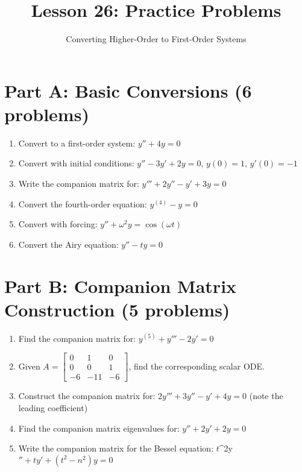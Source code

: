\documentclass[12pt]{article}
\title{Lesson 26: Practice Problems}
\author{Converting Higher-Order to First-Order Systems}
\date{}
\begin{document}
\maketitle

\section*{Part A: Basic Conversions (6 problems)}

\begin{enumerate}
\item Convert to a first-order system: $y'' + 4y = 0$

\item Convert with initial conditions: $y'' - 3y' + 2y = 0$, $y(0) = 1$, $y'(0) = -1$

\item Write the companion matrix for: $y''' + 2y'' - y' + 3y = 0$

\item Convert the fourth-order equation: $y^{(4)} - y = 0$

\item Convert with forcing: $y'' + \omega^{2} y = \cos(\omega t)$

\item Convert the Airy equation: $y'' - ty = 0$
\end{enumerate}

\section*{Part B: Companion Matrix Construction (5 problems)}

\begin{enumerate}[resume]
\item Find the companion matrix for: $y^{(5)} + y''' - 2y' = 0$

\item Given $A = \begin{bmatrix} 0 & 1 & 0 \\ 0 & 0 & 1 \\ -6 & -11 & -6 \end{bmatrix}$, find the corresponding scalar ODE.

\item Construct the companion matrix for: $2y''' + 3y'' - y' + 4y = 0$ (note the leading coefficient)

\item Find the companion matrix eigenvalues for: $y'' + 2y' + 2y = 0$

\item Write the companion matrix for the Bessel equation: $t$^{2y}$'' + ty' + (t^{2} - n^{2})y = 0$
\end{enumerate}
\end{document}
